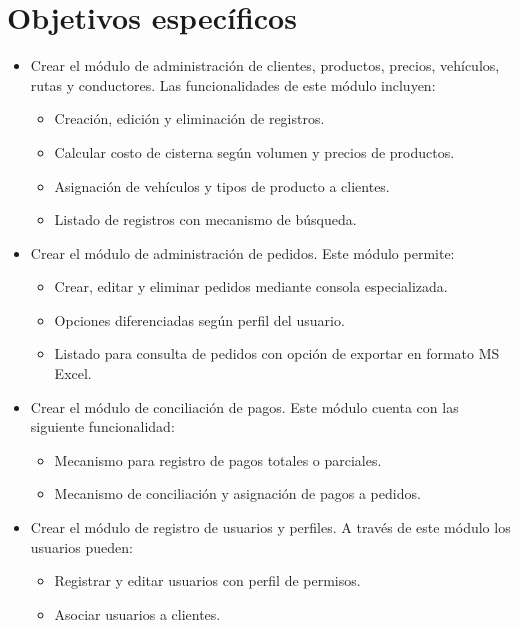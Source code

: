 \section*{Objetivos específicos}
\begin{itemize}
    \item Crear el módulo de administración de clientes, productos, precios, vehículos, rutas y conductores. Las funcionalidades de este módulo incluyen:
    \begin{itemize}
        \item Creación, edición y eliminación de registros.
        \item Calcular costo de cisterna según volumen y precios de productos.
        \item Asignación de vehículos y tipos de producto a clientes.
        \item Listado de registros con mecanismo de búsqueda.
    \end{itemize}

    \item Crear el módulo de administración de pedidos. Este módulo permite:
    \begin{itemize}
        \item Crear, editar y eliminar pedidos mediante consola especializada.
        \item Opciones diferenciadas según perfil del usuario.
        \item Listado para consulta de pedidos con opción de exportar en formato MS Excel.
    \end{itemize}

    \item Crear el módulo de conciliación de pagos. Este módulo cuenta con las siguiente funcionalidad:
    \begin{itemize}
        \item Mecanismo para registro de pagos totales o parciales.
        \item Mecanismo de conciliación y asignación de pagos a pedidos.
    \end{itemize}

    \item Crear el módulo de registro de usuarios y perfiles. A través de este módulo los usuarios pueden:
    \begin{itemize}
        \item Registrar y editar usuarios con perfil de permisos.
        \item Asociar usuarios a clientes.
    \end{itemize}
\end{itemize}